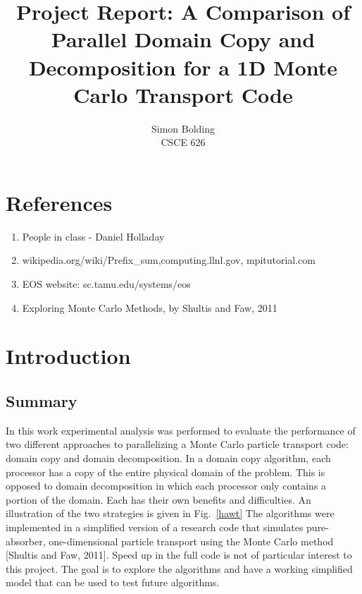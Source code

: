 \documentclass[12pt]{article}
\begin{document}
 
 
\title{Project Report: A Comparison of Parallel Domain Copy and Decomposition for a
1D Monte Carlo Transport Code}%
\author{Simon Bolding\\ %
CSCE 626} %
 
\maketitle

\clearpage

%

\section*{References}

\begin{enumerate}
	\item People in class - Daniel Holladay
	\item wikipedia.org/wiki/Prefix\_sum,computing.llnl.gov, mpitutorial.com
    \item EOS website: sc.tamu.edu/systems/eos
    \item Exploring Monte Carlo Methods, by Shultis and Faw, 2011
\end{enumerate}

\section{Introduction}

\subsection{Summary}

In this work experimental analysis was performed to evaluate the performance
of two different approaches to parallelizing a Monte Carlo particle transport code:
domain copy and domain decomposition.  In a domain copy algorithm, each processor has a copy of
the entire physical domain of the problem. This is opposed to domain decomposition in
which each processor only contains a portion of the domain. Each has their own
benefits and difficulties. An illustration of the two strategies is given in
Fig.~\ref{hawt} The algorithms were
implemented in a simplified version of a research code that simulates pure-absorber,
one-dimensional particle transport using the Monte Carlo method [Shultis and Faw,
2011].  Speed up in the full code is not of particular interest to this project.  The goal is to
explore the algorithms and have a working simplified model that can be used to test
future algorithms.
\end{document}
